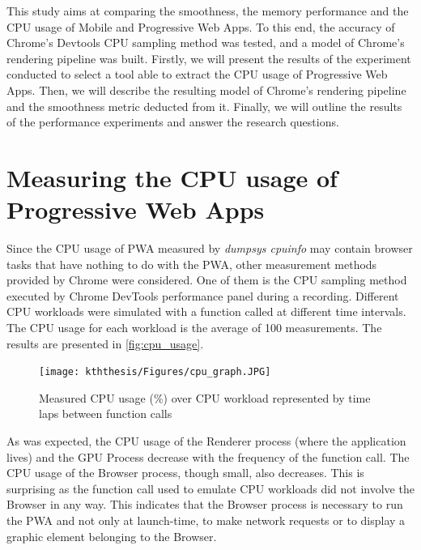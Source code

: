 \documentclass{kththesis}
\begin{document}
This study aims at comparing the smoothness, the memory performance and the CPU usage of Mobile and Progressive Web Apps. To this end, the accuracy of Chrome's Devtools CPU sampling method was tested, and a model of Chrome's rendering pipeline was built. 
Firstly, we will present the results of the experiment conducted to select a tool able to extract the CPU usage of Progressive Web Apps. Then, we will describe the resulting model of Chrome's rendering pipeline and the smoothness metric deducted from it. Finally, we will outline the results of the performance experiments and answer the research questions.  


\section{Measuring the CPU usage of Progressive Web Apps}
\label{results:cpu}
Since the CPU usage of PWA measured by \textit{dumpsys cpuinfo} may contain browser tasks that have nothing to do with the PWA, other measurement methods provided by Chrome were considered. One of them is the CPU sampling method executed by Chrome DevTools performance panel during a recording. 
Different CPU workloads were simulated with a function called at different time intervals. The CPU usage for each workload is the average of 100 measurements. The results are presented in \autoref{fig:cpu_usage}.

\begin{figure}[h]
    \centering
    \texttt{[image: kththesis/Figures/cpu\_graph.JPG]}
    \caption[Measurements of CPU Usage of PWA]{Measured CPU usage (\%) over CPU workload represented by time laps between function calls}
    \label{fig:cpu_usage}
\end{figure}

As was expected, the CPU usage of the Renderer process (where the application lives) and the GPU Process decrease with the frequency of the function call. The CPU usage of the Browser process, though small, also decreases. This is surprising as the function call used to emulate CPU workloads did not involve the Browser in any way. This indicates that the Browser process is necessary to run the PWA and not only at launch-time, to make network requests or to display a graphic element belonging to the Browser.
\end{document}
